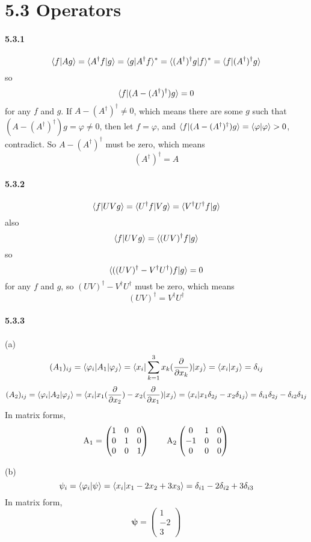 \documentclass[a4paper]{article}
\begin{document}
\section*{5.3 Operators}

\paragraph{5.3.1}
\[
\langle f|Ag\rangle=\langle A^{\dagger}f|g\rangle=\langle g|A^\dagger f\rangle^*=\langle(A^\dagger)^\dagger g|f\rangle^*=\langle f|(A^\dagger)^\dagger g\rangle
\]
so \[
\langle f|(A-(A^\dagger)^\dagger)g\rangle=0
\]
for any $f$ and $g$. If $A-(A^\dagger)^\dagger\neq0$, which means there are some $g$ such that $(A-(A^\dagger)^\dagger) g=\varphi\neq0$, then let $f=\varphi$, and $\langle f|(A-(A^\dagger)^\dagger)g\rangle=\langle\varphi|\varphi\rangle>0$, contradict. So $A-(A^\dagger)^\dagger$ must be zero, which means \[
(A^\dagger)^\dagger=A
\]

\paragraph{5.3.2}
\[
\langle f|UVg\rangle=\langle U^\dagger f|Vg\rangle=\langle V^\dagger U^\dagger f|g\rangle
\]
also
\[
\langle f|UVg\rangle=\langle(UV)^\dagger f|g\rangle
\]
so 
\[
\langle((UV)^\dagger-V^\dagger U^\dagger)f|g\rangle=0
\]
for any $f$ and $g$, so $(UV)^\dagger-V^\dagger U^\dagger$ must be zero, which means
\[
(UV)^\dagger=V^\dagger U^\dagger
\]

\paragraph{5.3.3}
(a) 
\[
(A_1)_{ij}=\langle\varphi_i|A_1|\varphi_j\rangle=\langle x_i|\sum_{k=1}^3x_k(\frac{\partial}{\partial x_k})|x_j\rangle=\langle x_i|x_j\rangle=\delta_{ij}
\]
\[
(A_2)_{ij}=\langle\varphi_i|A_2|\varphi_j\rangle=\langle x_i|x_1(\frac{\partial}{\partial x_2})-x_2(\frac{\partial}{\partial x_1})|x_j\rangle=\langle x_i|x_1\delta_{2j}-x_2\delta_{1j}\rangle=\delta_{i1}\delta_{2j}-\delta_{i2}\delta_{1j}
\]
In matrix forms,
\[
\mathrm{A_1}=
\begin{pmatrix}
1&0&0\\
0&1&0\\
0&0&1
\end{pmatrix}
\quad\quad \mathrm{A_2}
\begin{pmatrix}
0&1&0\\
-1&0&0\\
0&0&0
\end{pmatrix}
\]

(b) 
\[
\psi_i=\langle\varphi_i|\psi\rangle=\langle x_i|x_1-2x_2+3x_3\rangle=\delta_{i1}-2\delta_{i2}+3\delta_{i3}
\]
In matrix form, 
\[
\boldsymbol{\psi}=
\begin{pmatrix}
1\\-2\\3
\end{pmatrix}
\]
\end{document}
